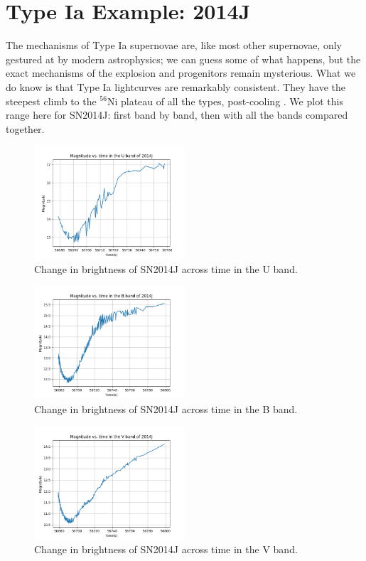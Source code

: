 \section{Type Ia Example: 2014J}
The mechanisms of Type Ia supernovae are, like most other supernovae, only gestured at by modern astrophysics; we can guess some of what happens, but the exact mechanisms of the explosion and progenitors remain mysterious. What we do know is that Type Ia lightcurves are remarkably consistent. They have the steepest climb to the $^{56}$Ni plateau of all the types, post-cooling \cite{CosmosTypeIa}. We plot this range here for SN2014J: first band by band, then with all the bands compared together.
\begin{figure}[htp]
	\includegraphics[width=0.5\textwidth]{2014J_U_magvstime.png}
	\caption{Change in brightness of SN2014J across time in the U band.}
\end{figure}
\begin{figure}[htp]
	\includegraphics[width=0.5\textwidth]{2014J_B_magvstime.png}
	\caption{Change in brightness of SN2014J across time in the B band.}
\end{figure}
\begin{figure}[htp]
	\includegraphics[width=0.5\textwidth]{2014J_V_magvstime.png}
	\caption{Change in brightness of SN2014J across time in the V band.}
\end{figure}
